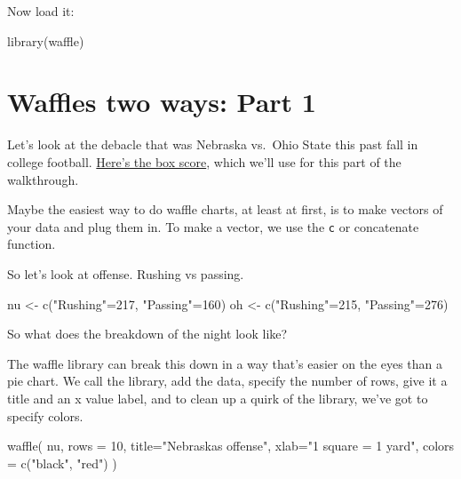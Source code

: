 \documentclass[
]{book}
\newenvironment{Shaded}{\begin{snugshade}}{\end{snugshade}}
\newcommand{\AttributeTok}[1]{\textcolor[rgb]{0.77,0.63,0.00}{#1}}
\newcommand{\DecValTok}[1]{\textcolor[rgb]{0.00,0.00,0.81}{#1}}
\newcommand{\FunctionTok}[1]{\textcolor[rgb]{0.00,0.00,0.00}{#1}}
\newcommand{\NormalTok}[1]{#1}
\newcommand{\OtherTok}[1]{\textcolor[rgb]{0.56,0.35,0.01}{#1}}
\newcommand{\StringTok}[1]{\textcolor[rgb]{0.31,0.60,0.02}{#1}}
\begin{document}
Now load it:

\begin{Shaded}
\begin{Highlighting}[]
\FunctionTok{library}\NormalTok{(waffle)}
\end{Highlighting}
\end{Shaded}

\hypertarget{waffles-two-ways-part-1}{%
\section{Waffles two ways: Part 1}\label{waffles-two-ways-part-1}}

Let's look at the debacle that was Nebraska vs.~Ohio State this past fall in college football. \href{https://www.espn.com/college-football/matchup?gameId=401112241}{Here's the box score}, which we'll use for this part of the walkthrough.

Maybe the easiest way to do waffle charts, at least at first, is to make vectors of your data and plug them in. To make a vector, we use the \texttt{c} or concatenate function.

So let's look at offense. Rushing vs passing.

\begin{Shaded}
\begin{Highlighting}[]
\NormalTok{nu }\OtherTok{\textless{}{-}} \FunctionTok{c}\NormalTok{(}\StringTok{"Rushing"}\OtherTok{=}\DecValTok{217}\NormalTok{, }\StringTok{"Passing"}\OtherTok{=}\DecValTok{160}\NormalTok{)}
\NormalTok{oh }\OtherTok{\textless{}{-}} \FunctionTok{c}\NormalTok{(}\StringTok{"Rushing"}\OtherTok{=}\DecValTok{215}\NormalTok{, }\StringTok{"Passing"}\OtherTok{=}\DecValTok{276}\NormalTok{)}
\end{Highlighting}
\end{Shaded}

So what does the breakdown of the night look like?

The waffle library can break this down in a way that's easier on the eyes than a pie chart. We call the library, add the data, specify the number of rows, give it a title and an x value label, and to clean up a quirk of the library, we've got to specify colors.

\begin{Shaded}
\begin{Highlighting}[]
\FunctionTok{waffle}\NormalTok{(}
\NormalTok{        nu, }
        \AttributeTok{rows =} \DecValTok{10}\NormalTok{, }
        \AttributeTok{title=}\StringTok{"Nebraska\textquotesingle{}s offense"}\NormalTok{, }
        \AttributeTok{xlab=}\StringTok{"1 square = 1 yard"}\NormalTok{, }
        \AttributeTok{colors =} \FunctionTok{c}\NormalTok{(}\StringTok{"black"}\NormalTok{, }\StringTok{"red"}\NormalTok{)}
\NormalTok{)}
\end{Highlighting}
\end{Shaded}
\end{document}
